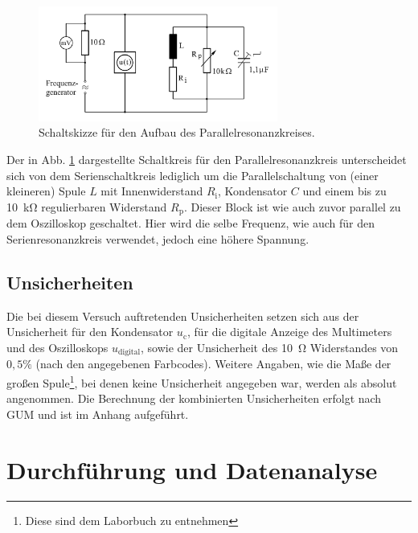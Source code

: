 			\begin{figure}[ht]
				\centering
				\includegraphics[width=0.7\textwidth]{auswertung/Parallelresonanz.PNG}
				\caption{Schaltskizze für den Aufbau des Parallelresonanzkreises.\cite{WWU}}
				\label{fig:ParallelResonanzSkizze}	
			\end{figure}
			
			Der in Abb. \ref{fig:ParallelResonanzSkizze} dargestellte Schaltkreis für den Parallelresonanzkreis unterscheidet sich von dem Serienschaltkreis lediglich um die Parallelschaltung von (einer kleineren) Spule $L$ mit Innenwiderstand $R_\text{i}$, Kondensator $C$ und einem bis zu \SI{10}{\kilo\ohm} regulierbaren Widerstand $R_\text{p}$. 
			Dieser Block ist wie auch zuvor parallel zu dem Oszilloskop geschaltet.
			Hier wird die selbe Frequenz, wie auch für den Serienresonanzkreis verwendet, jedoch eine höhere Spannung.

	\subsection{Unsicherheiten} 

		Die bei diesem Versuch auftretenden Unsicherheiten setzen sich aus der Unsicherheit für den Kondensator $u_\text{c}$, für die digitale Anzeige des Multimeters und des Oszilloskops $u_\text{digital}$, sowie der Unsicherheit des \SI{10}{\ohm} Widerstandes von $0,5\%$ (nach den angegebenen Farbcodes\cite{widerstand}). 
		Weitere Angaben, wie die Maße der großen Spule\footnote{Diese sind dem Laborbuch zu entnehmen}, bei denen keine Unsicherheit angegeben war, werden als absolut angenommen. 
		Die Berechnung der kombinierten Unsicherheiten erfolgt nach GUM und ist im Anhang aufgeführt.

\section{Durchführung und Datenanalyse}

